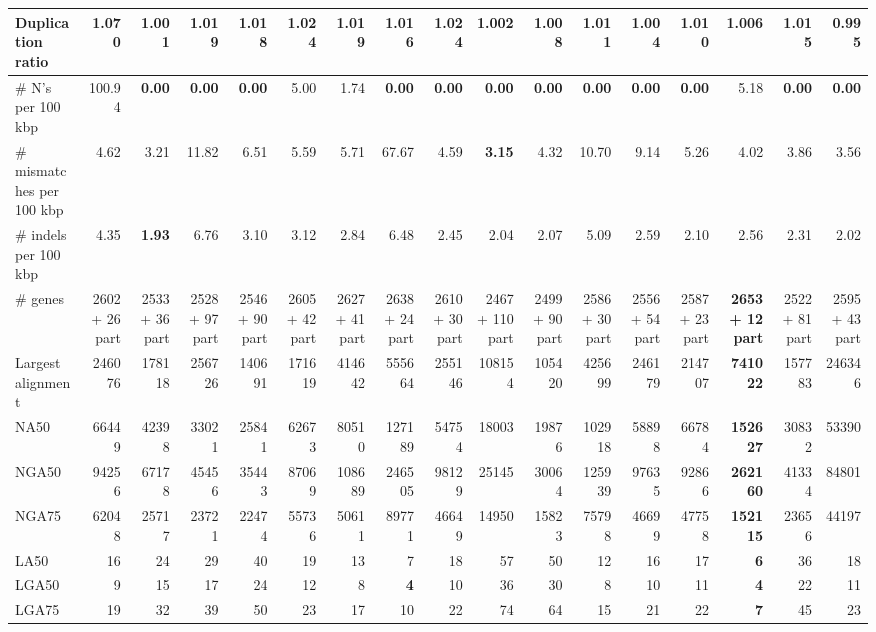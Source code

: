 \documentclass[12pt,a4paper]{article}
\begin{document}
\begin{table}[ht]
\begin{center}
\begin{tabular}{|l*{16}{|r}|}
Duplication ratio & 1.070 & 1.001 & 1.019 & 1.018 & 1.024 & 1.019 & 1.016 & 1.024 & 1.002 & 1.008 & 1.011 & 1.004 & 1.010 & 1.006 & 1.015 & {\bf 0.995} \\ \hline
\# N's per 100 kbp & 100.94 & {\bf 0.00} & {\bf 0.00} & {\bf 0.00} & 5.00 & 1.74 & {\bf 0.00} & {\bf 0.00} & {\bf 0.00} & {\bf 0.00} & {\bf 0.00} & {\bf 0.00} & {\bf 0.00} & 5.18 & {\bf 0.00} & {\bf 0.00} \\ \hline
\# mismatches per 100 kbp & 4.62 & 3.21 & 11.82 & 6.51 & 5.59 & 5.71 & 67.67 & 4.59 & {\bf 3.15} & 4.32 & 10.70 & 9.14 & 5.26 & 4.02 & 3.86 & 3.56 \\ \hline
\# indels per 100 kbp & 4.35 & {\bf 1.93} & 6.76 & 3.10 & 3.12 & 2.84 & 6.48 & 2.45 & 2.04 & 2.07 & 5.09 & 2.59 & 2.10 & 2.56 & 2.31 & 2.02 \\ \hline
\# genes & 2602 + 26 part & 2533 + 36 part & 2528 + 97 part & 2546 + 90 part & 2605 + 42 part & 2627 + 41 part & 2638 + 24 part & 2610 + 30 part & 2467 + 110 part & 2499 + 90 part & 2586 + 30 part & 2556 + 54 part & 2587 + 23 part & {\bf 2653 + 12 part} & 2522 + 81 part & 2595 + 43 part \\ \hline
Largest alignment & 246076 & 178118 & 256726 & 140691 & 171619 & 414642 & 555664 & 255146 & 108154 & 105420 & 425699 & 246179 & 214707 & {\bf 741022} & 157783 & 246346 \\ \hline
NA50 & 66449 & 42398 & 33021 & 25841 & 62673 & 80510 & 127189 & 54754 & 18003 & 19876 & 102918 & 58898 & 66784 & {\bf 152627} & 30832 & 53390 \\ \hline
NGA50 & 94256 & 67178 & 45456 & 35443 & 87069 & 108689 & 246505 & 98129 & 25145 & 30064 & 125939 & 97635 & 92866 & {\bf 262160} & 41334 & 84801 \\ \hline
NGA75 & 62048 & 25717 & 23721 & 22474 & 55736 & 50611 & 89771 & 46649 & 14950 & 15823 & 75798 & 46699 & 47758 & {\bf 152115} & 23656 & 44197 \\ \hline
LA50 & 16 & 24 & 29 & 40 & 19 & 13 & 7 & 18 & 57 & 50 & 12 & 16 & 17 & {\bf 6} & 36 & 18 \\ \hline
LGA50 & 9 & 15 & 17 & 24 & 12 & 8 & {\bf 4} & 10 & 36 & 30 & 8 & 10 & 11 & {\bf 4} & 22 & 11 \\ \hline
LGA75 & 19 & 32 & 39 & 50 & 23 & 17 & 10 & 22 & 74 & 64 & 15 & 21 & 22 & {\bf 7} & 45 & 23 \\ \hline
\end{tabular}
\end{center}
\end{table}
\end{document}
